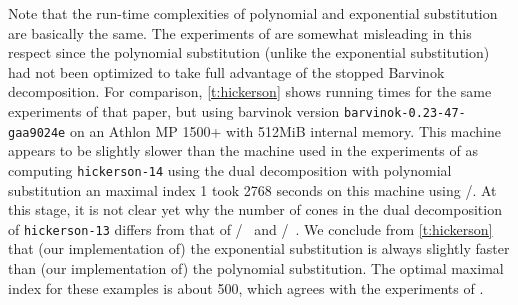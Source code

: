 Note that the run-time complexities of polynomial and exponential
substitution are basically the same.  The experiments of
 are somewhat misleading in this respect
since the polynomial substitution (unlike the exponential
substitution) had not been optimized to take full
advantage of the stopped Barvinok decomposition.
For comparison, \autoref{t:hickerson} shows running times
for the same experiments of that paper, but using
barvinok version \verb+barvinok-0.23-47-gaa9024e+
on an Athlon MP 1500+ with 512MiB internal memory.
This machine appears to be slightly slower than the
machine used in the experiments of 
as computing {\tt hickerson-14} using the dual decomposition
with polynomial substitution an maximal index 1
took 2768 seconds on this machine using \LattEmk/.
At this stage, it is not clear yet why the number of
cones in the dual decomposition of {\tt hickerson-13}
differs from that of \LattE/~ and
\LattEmk/~\cite{latte-macchiato}.
We conclude from \autoref{t:hickerson} that (our implementation of)
the exponential substitution is always slightly faster than
(our implementation of) the polynomial substitution.
The optimal maximal index for these examples is about 500,
which agrees with the experiments of .

